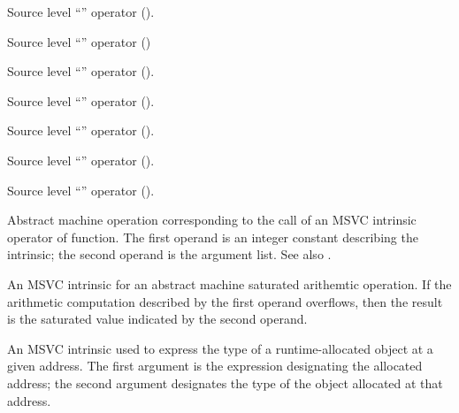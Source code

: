 Source level ``'' operator ().

Source level ``'' operator ()

Source level ``'' operator ().

Source level ``'' operator ().

Source level ``'' operator ().

Source level ``'' operator ().

Source level ``'' operator ().

Abstract machine operation corresponding to the call of an MSVC intrinsic operator of function.
The first operand is an integer constant describing the intrinsic; the second operand is the argument list.
See also .

An MSVC intrinsic for an abstract machine saturated arithemtic operation. 
If the arithmetic computation described by the first operand overflows, 
then the result is the saturated value indicated by the second operand.

An MSVC intrinsic used to express the type of a runtime-allocated object at a given address.
The first argument is the expression designating the allocated address; the second argument designates the type of the object allocated at that address.

